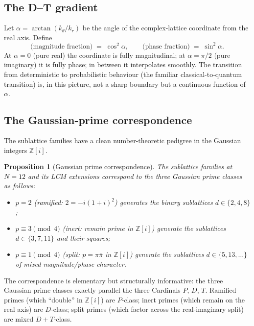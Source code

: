 \documentclass[11pt,a4paper]{article}
\newtheorem{proposition}[theorem]{Proposition}
\theoremstyle{definition}
\theoremstyle{remark}
\newcommand{\Z}{\mathbb{Z}}
\begin{document}
\subsection{The D--T gradient}

Let $\alpha = \arctan(k_{\theta}/k_{r})$ be the angle of the complex-lattice coordinate from the real axis. Define
\[
\text{(magnitude fraction)} \;=\; \cos^{2}\alpha, \qquad \text{(phase fraction)} \;=\; \sin^{2}\alpha.
\]
At $\alpha=0$ (pure real) the coordinate is fully magnitudinal; at $\alpha=\pi/2$ (pure imaginary) it is fully phase; in between it interpolates smoothly. The transition from deterministic to probabilistic behaviour (the familiar classical-to-quantum transition) is, in this picture, not a sharp boundary but a continuous function of $\alpha$.

\subsection{The Gaussian-prime correspondence}

The sublattice families have a clean number-theoretic pedigree in the Gaussian integers $\Z[i]$.

\begin{proposition}[Gaussian prime correspondence]\label{prop:gaussian}
The sublattice families at $N=12$ and its LCM extensions correspond to the three Gaussian prime classes as follows:
\begin{itemize}[leftmargin=*]
\item $p=2$ (ramified: $2=-i(1+i)^{2}$) generates the binary sublattices $d\in\{2,4,8\}$;
\item $p\equiv 3\pmod 4$ (inert: remain prime in $\Z[i]$) generate the sublattices $d\in\{3,7,11\}$ and their squares;
\item $p\equiv 1\pmod 4$ (split: $p=\pi\bar\pi$ in $\Z[i]$) generate the sublattices $d\in\{5,13,\ldots\}$ of mixed magnitude/phase character.
\end{itemize}
\end{proposition}

The correspondence is elementary but structurally informative: the three Gaussian prime classes exactly parallel the three Cardinals $P$, $D$, $T$. Ramified primes (which ``double'' in $\Z[i]$) are $P$-class; inert primes (which remain on the real axis) are $D$-class; split primes (which factor across the real-imaginary split) are mixed $D{+}T$-class.

\end{document}
